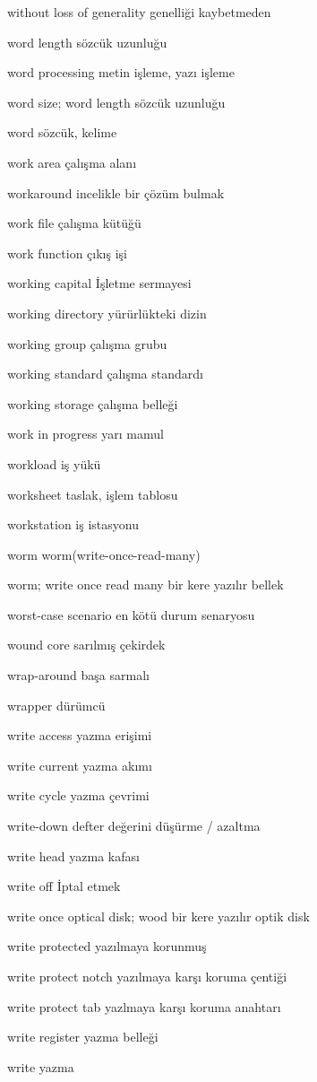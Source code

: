 \documentclass[12pt,fleqn]{article}\usepackage{../../common}
\begin{document}
without loss of generality genelliği kaybetmeden

word length sözcük uzunluğu

word processing metin işleme, yazı işleme

word size; word length sözcük uzunluğu

word sözcük, kelime

work area çalışma alanı

workaround incelikle bir çözüm bulmak

work file çalışma kütüğü

work function çıkış işi

working capital İşletme sermayesi

working directory yürürlükteki dizin

working group çalışma grubu

working standard çalışma standardı

working storage çalışma belleği

work in progress yarı mamul

workload iş yükü

worksheet taslak, işlem tablosu

workstation iş istasyonu

worm worm(write-once-read-many)

worm; write once read many bir kere yazılır bellek

worst-case scenario en kötü durum senaryosu

wound core sarılmış çekirdek

wrap-around başa sarmalı

wrapper dürümcü

write access yazma erişimi

write current yazma akımı

write cycle yazma çevrimi

write-down defter değerini düşürme / azaltma

write head yazma kafası

write off İptal etmek

write once optical disk; wood bir kere yazılır optik disk

write protected yazılmaya korunmuş

write protect notch yazılmaya karşı koruma çentiği

write protect tab yazlmaya karşı koruma anahtarı

write register yazma belleği

write yazma
\end{document}
